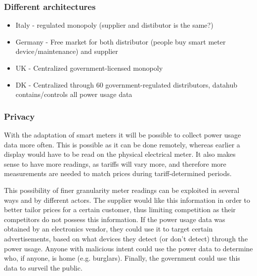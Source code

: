 \subsubsection{Different architectures}
\begin{itemize}
	\item Italy - regulated monopoly (supplier and distibutor is the same?)
	\item Germany - Free market for both distributor (people buy smart meter device/maintenance) and supplier
	\item UK - Centralized government-licensed monopoly
	\item DK - Centralized through 60 government-regulated distributors, datahub contains/controls all power usage data
\end{itemize}

\subsubsection{Privacy}
With the adaptation of smart meters it will be possible to collect power usage data more often.
This is possible as it can be done remotely, whereas earlier a display would have to be read on the physical electrical meter.
It also makes sense to have more readings, as tariffs will vary more, and therefore more measurements are needed to match prices during tariff-determined periods.

This possibility of finer granularity meter readings can be exploited in several ways and by different actors.
The supplier would like this information in order to better tailor prices for a certain customer, thus limiting competition as their competitors do not possess this information.
If the power usage data was obtained by an electronics vendor, they could use it to target certain advertisements, based on what devices they detect (or don't detect) through the power usage.
Anyone with malicious intent could use the power data to determine who, if anyone, is home (e.g. burglars).
Finally, the government could use this data to surveil the public.

